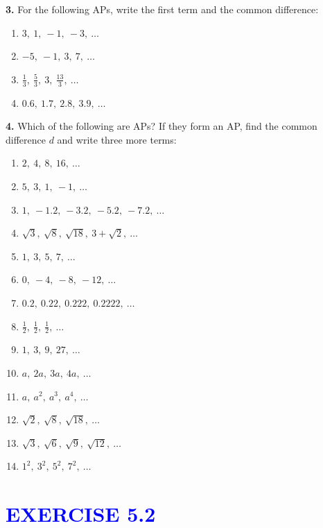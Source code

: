 \documentclass[12pt]{article}
\begin{document}
\textbf{3.} For the following APs, write the first term and the common difference:

\begin{multicols}{2}
\begin{enumerate}[label=(\alph*)]
    \item \( 3,\ 1,\ -1,\ -3,\ \ldots \)
    \item \( -5,\ -1,\ 3,\ 7,\ \ldots \)
    \item \( \frac{1}{3},\ \frac{5}{3},\ 3,\ \frac{13}{3},\ \ldots \)
    \item \( 0.6,\ 1.7,\ 2.8,\ 3.9,\ \ldots \)
\end{enumerate}
\end{multicols}

\textbf{4.} Which of the following are APs? If they form an AP, find the common difference \( d \) and write three more terms:

\begin{multicols}{2}
\begin{enumerate}[label=(\alph*)]
    \item \( 2,\ 4,\ 8,\ 16,\ \ldots \)
    \item \( 5,\ 3,\ 1,\ -1,\ \ldots \)
    \item \( 1,\ -1.2,\ -3.2,\ -5.2,\ -7.2,\ \ldots \)
    \item \( \sqrt{3},\ \sqrt{8},\ \sqrt{18},\ 3 + \sqrt{2},\ \ldots \)
    \item \( 1,\ 3,\ 5,\ 7,\ \ldots \)
    \item \( 0,\ -4,\ -8,\ -12,\ \ldots \)
    \item \( 0.2,\ 0.22,\ 0.222,\ 0.2222,\ \ldots \)
    \item \( \frac{1}{2},\ \frac{1}{2},\ \frac{1}{2},\ \ldots \)
    \item \( 1,\ 3,\ 9,\ 27,\ \ldots \)
    \item \( a,\ 2a,\ 3a,\ 4a,\ \ldots \)
    \item \( a,\ a^2,\ a^3,\ a^4,\ \ldots \)
    \item \( \sqrt{2},\ \sqrt{8},\ \sqrt{18},\ \ldots \)
    \item \( \sqrt{3},\ \sqrt{6},\ \sqrt{9},\ \sqrt{12},\ \ldots \)
    \item \( 1^2,\ 3^2,\ 5^2,\ 7^2,\ \ldots \)
\end{enumerate}
\end{multicols}

\vspace{0.5em}
\section*{\textcolor{blue}{\large EXERCISE 5.2}}
\end{document}
